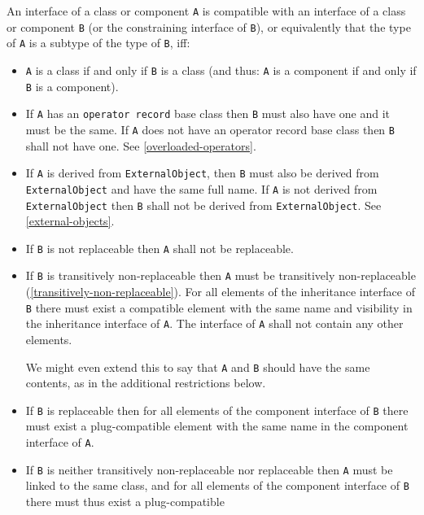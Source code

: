 An interface of a class or component \lstinline!A! is compatible with an interface
of a class or component \lstinline!B! (or the constraining interface of \lstinline!B!), or
equivalently that the type of \lstinline!A! is a subtype of the type of \lstinline!B!, iff:
\begin{itemize}
\item
  \lstinline!A! is a class if and only if \lstinline!B! is a class (and thus: \lstinline!A! is a component
  if and only if \lstinline!B! is a component).
\item
  If \lstinline!A! has an \lstinline!operator record! base class then \lstinline!B! must also have one and it must be the same.
  If \lstinline!A! does not have an operator record base class then \lstinline!B! shall not have one.
  See \cref{overloaded-operators}.
\item
  If \lstinline!A! is derived from \lstinline!ExternalObject!, then \lstinline!B! must also be derived from
  \lstinline!ExternalObject! and have the same full name. If \lstinline!A! is not derived from
  \lstinline!ExternalObject! then \lstinline!B! shall not be derived from \lstinline!ExternalObject!. See
  \cref{external-objects}.
\item
  If \lstinline!B! is not replaceable then \lstinline!A! shall not be replaceable.
\item
  If \lstinline!B! is transitively non-replaceable then \lstinline!A! must be transitively
  non-replaceable (\cref{transitively-non-replaceable}). For all elements of the inheritance
  interface of \lstinline!B! there must exist a compatible element with the same
  name and visibility in the inheritance interface of \lstinline!A!. The interface
  of \lstinline!A! shall not contain any other elements.
  \begin{nonnormative}
  We might even extend this to say that \lstinline!A! and \lstinline!B! should have the same contents, as in the additional restrictions below.
  \end{nonnormative}
\item
  If \lstinline!B! is replaceable then for all elements of the component interface
  of \lstinline!B! there must exist a plug-compatible element with the same name in
  the component interface of \lstinline!A!.
\item
  If \lstinline!B! is neither transitively non-replaceable nor replaceable then \lstinline!A!
  must be linked to the same class, and for all elements of the
  component interface of \lstinline!B! there must thus exist a plug-compatible

\end{itemize}
